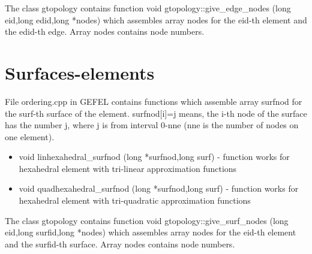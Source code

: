 The class gtopology contains function
void gtopology::give\_edge\_nodes (long eid,long edid,long *nodes)
which assembles array nodes for the eid-th element and the edid-th edge.
Array nodes contains node numbers.




\section{Surfaces-elements}

File ordering.cpp in GEFEL contains functions which assemble array surfnod for
the surf-th surface of the element. surfnod[i]=j means, the i-th node of the surface
has the number j, where j is from interval 0-nne (nne is the number of nodes
on one element).

\begin{itemize}
\item
void linhexahedral\_surfnod (long *surfnod,long surf) - function works for hexahedral element
with tri-linear approximation functions
\item
void quadhexahedral\_surfnod (long *surfnod,long surf) - function works for hexahedral
element with tri-quadratic approximation functions
\end{itemize}

The class gtopology contains function
void gtopology::give\_surf\_nodes (long eid,long surfid,long *nodes)
which assembles array nodes for the eid-th element and the surfid-th surface.
Array nodes contains node numbers.

